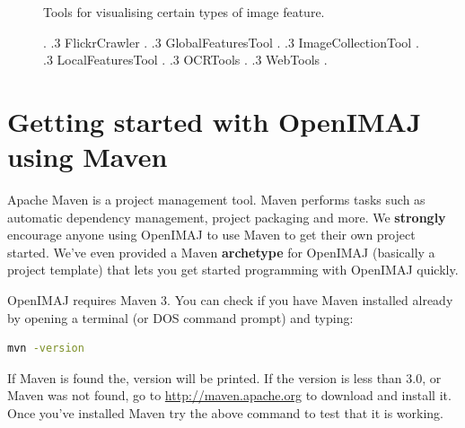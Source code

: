 \documentclass[10pt,a4paper,twoside,extrafontsizes]{memoir}
\begin{document}
\begin{figure}[h!]
{{\begin{minipage}[t]{\descwidth}
Tools for visualising certain types of image feature.
\end{minipage}}.
.3 FlickrCrawler .
.3 GlobalFeaturesTool .
.3 ImageCollectionTool .
.3 LocalFeaturesTool .
.3 OCRTools .
.3 WebTools .
}
\end{figure}

\chapter{Getting started with OpenIMAJ using Maven}
\pagestyle{headings}
Apache Maven is a project management tool.  Maven performs tasks such 
as automatic  dependency management, project packaging and more. We \textbf{strongly} 
encourage anyone using OpenIMAJ to use Maven to get their own project started. 
We've even provided a Maven \textbf{archetype} for OpenIMAJ (basically a project template) 
that lets you get started programming with OpenIMAJ quickly. 

OpenIMAJ requires Maven 3. You can check if you have Maven installed already 
by opening a terminal (or DOS command prompt) and typing:
\begin{lstlisting}[language=bash]
mvn -version
\end{lstlisting}
If Maven is found the, version will be printed. If the version is less than 3.0, 
or Maven was not found, go to \url{http://maven.apache.org} to download and 
install it. Once you've installed Maven try the above command to test that it 
is working.
\end{document}
